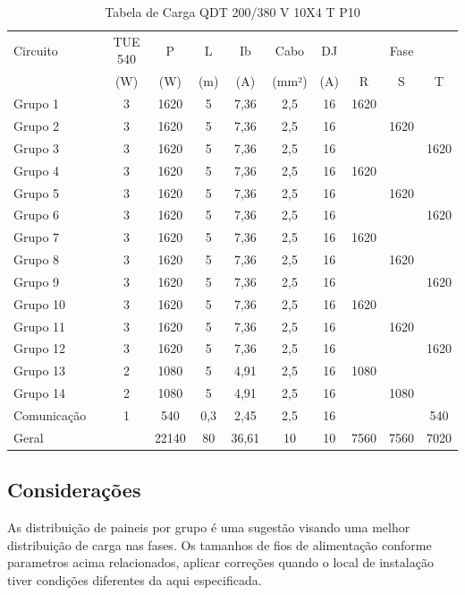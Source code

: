 \begin{table}[htbp]
\centering
\caption{Tabela de Carga QDT 200/380 V 10X4 T P10}

\begin{tabular}{@{}llccccccccc@{}}
\toprule
Circuito &  &TUE 540 & P & L & Ib & Cabo & DJ & \multicolumn{3}{c}{Fase} \\
        & & (W) & (W) & (m) & (A) & (mm²) & (A) & R & S & T \\
\midrule
Grupo 1 & & 3 & 1620 & 5 & 7,36 & 2,5 & 16 & 1620 &  &  \\
Grupo 2 & & 3 & 1620 & 5 & 7,36 & 2,5 & 16 &   & 1620 &  \\
Grupo 3 & & 3 & 1620 & 5 & 7,36 & 2,5 & 16 &   &   & 1620 \\
Grupo 4 & &3 & 1620 & 5 & 7,36 & 2,5 & 16 & 1620 &   &   \\
Grupo 5 && 3 & 1620 & 5 & 7,36 & 2,5 & 16 &   & 1620 &   \\
Grupo 6 & & 3 & 1620 & 5 & 7,36 & 2,5 & 16 &  &  & 1620 \\
Grupo 7 & &  3 & 1620 & 5 & 7,36 & 2,5 & 16 & 1620 &   &   \\
Grupo 8 & & 3 & 1620 & 5 & 7,36 & 2,5 & 16 &   & 1620 &   \\
Grupo 9 & & 3 & 1620 & 5 & 7,36 & 2,5 & 16 &   &   & 1620 \\
Grupo 10 & &3 & 1620 & 5 & 7,36 & 2,5 & 16 & 1620 &   &   \\
Grupo 11 & &3 & 1620 & 5 & 7,36 & 2,5 & 16 &   & 1620 &   \\
Grupo 12 & &3 & 1620 & 5 & 7,36 & 2,5 & 16 &   &   & 1620 \\
Grupo 13 & &2 & 1080 & 5 & 4,91 & 2,5 & 16 & 1080 &   &   \\
Grupo 14 & &2 & 1080 & 5 & 4,91 & 2,5 & 16 &   & 1080 &   \\
Comunicação & & 1 & 540 & 0,3 & 2,45 & 2,5 & 16 &  &  & 540 \\
Geral & & & 22140 & 80 & 36,61 & 10 & 10 & 7560 & 7560 & 7020 \\
\bottomrule
\end{tabular}
\label{tab:cargaT_10x4P10}
\end{table}


\subsection{Considerações}
As distribuição de paineis por grupo é uma sugestão visando uma melhor distribuição de carga nas fases.
Os tamanhos de fios de alimentação conforme parametros acima relacionados, aplicar correções quando o local de instalação tiver condições diferentes da aqui especificada.

